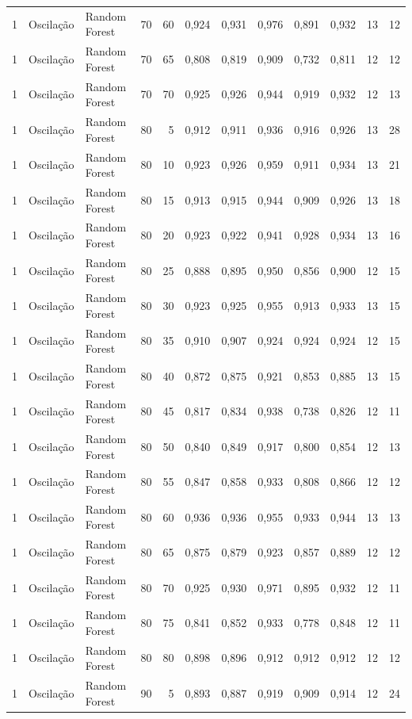 \begin{longtable}{@{}rllrrrrrrrrr@{}}
1 & Oscilação & Random Forest & 70 & 60 & 0,924 & 0,931 & 0,976 & 0,891 & 0,932 & 13 & 12 \\
1 & Oscilação & Random Forest & 70 & 65 & 0,808 & 0,819 & 0,909 & 0,732 & 0,811 & 12 & 12 \\
1 & Oscilação & Random Forest & 70 & 70 & 0,925 & 0,926 & 0,944 & 0,919 & 0,932 & 12 & 13 \\
1 & Oscilação & Random Forest & 80 & 5 & 0,912 & 0,911 & 0,936 & 0,916 & 0,926 & 13 & 28 \\
1 & Oscilação & Random Forest & 80 & 10 & 0,923 & 0,926 & 0,959 & 0,911 & 0,934 & 13 & 21 \\
1 & Oscilação & Random Forest & 80 & 15 & 0,913 & 0,915 & 0,944 & 0,909 & 0,926 & 13 & 18 \\
1 & Oscilação & Random Forest & 80 & 20 & 0,923 & 0,922 & 0,941 & 0,928 & 0,934 & 13 & 16 \\
1 & Oscilação & Random Forest & 80 & 25 & 0,888 & 0,895 & 0,950 & 0,856 & 0,900 & 12 & 15 \\
1 & Oscilação & Random Forest & 80 & 30 & 0,923 & 0,925 & 0,955 & 0,913 & 0,933 & 13 & 15 \\
1 & Oscilação & Random Forest & 80 & 35 & 0,910 & 0,907 & 0,924 & 0,924 & 0,924 & 12 & 15 \\
1 & Oscilação & Random Forest & 80 & 40 & 0,872 & 0,875 & 0,921 & 0,853 & 0,885 & 13 & 15 \\
1 & Oscilação & Random Forest & 80 & 45 & 0,817 & 0,834 & 0,938 & 0,738 & 0,826 & 12 & 11 \\
1 & Oscilação & Random Forest & 80 & 50 & 0,840 & 0,849 & 0,917 & 0,800 & 0,854 & 12 & 13 \\
1 & Oscilação & Random Forest & 80 & 55 & 0,847 & 0,858 & 0,933 & 0,808 & 0,866 & 12 & 12 \\
1 & Oscilação & Random Forest & 80 & 60 & 0,936 & 0,936 & 0,955 & 0,933 & 0,944 & 13 & 13 \\
1 & Oscilação & Random Forest & 80 & 65 & 0,875 & 0,879 & 0,923 & 0,857 & 0,889 & 12 & 12 \\
1 & Oscilação & Random Forest & 80 & 70 & 0,925 & 0,930 & 0,971 & 0,895 & 0,932 & 12 & 11 \\
1 & Oscilação & Random Forest & 80 & 75 & 0,841 & 0,852 & 0,933 & 0,778 & 0,848 & 12 & 11 \\
1 & Oscilação & Random Forest & 80 & 80 & 0,898 & 0,896 & 0,912 & 0,912 & 0,912 & 12 & 12 \\
1 & Oscilação & Random Forest & 90 & 5 & 0,893 & 0,887 & 0,919 & 0,909 & 0,914 & 12 & 24 \\

\end{longtable}
